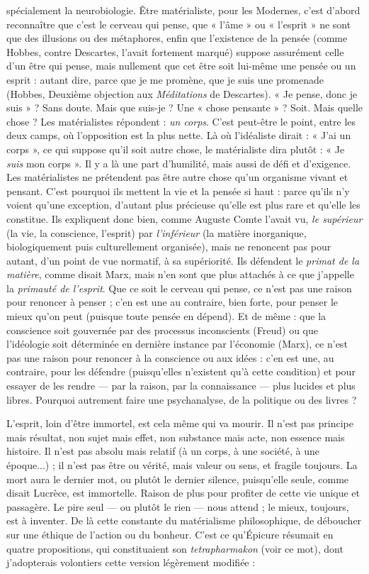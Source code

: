 spécialement la neurobiologie. Être matérialiste, pour les Modernes, c’est
d’abord reconnaître que c’est le cerveau qui pense, que « l’âme » ou « l'esprit »
ne sont que des illusions ou des métaphores, enfin que l'existence de la pensée
(comme Hobbes, contre Descartes, l’avait fortement marqué) suppose assurément
celle d’un être qui pense, mais nullement que cet être soit lui-même une
pensée ou un esprit : autant dire, parce que je me promène, que je suis une promenade
(Hobbes, Deuxième objection aux {\it Méditations} de Descartes). « Je
pense, donc je suis » ? Sans doute. Mais que suis-je ? Une « chose pensante » ?
Soit. Mais quelle chose ? Les matérialistes répondent : {\it un corps}. C’est peut-être
le point, entre les deux camps, où l'opposition est la plus nette. Là où l’idéaliste
dirait : « J’ai un corps », ce qui suppose qu'il soit autre chose, le matérialiste
dira plutôt : « Je {\it suis} mon corps ». Il y a là une part d’humilité, mais aussi de
défi et d’exigence. Les matérialistes ne prétendent pas être autre chose qu’un
organisme vivant et pensant. C’est pourquoi ils mettent la vie et la pensée si
haut : parce qu’ils n’y voient qu’une exception, d’autant plus précieuse qu’elle
est plus rare et qu’elle les constitue. Ils expliquent donc bien, comme Auguste
Comte l'avait vu, {\it le supérieur} (la vie, la conscience, l'esprit) par {\it l’inférieur} (la
matière inorganique, biologiquement puis culturellement organisée), mais ne
renoncent pas pour autant, d’un point de vue normatif, à sa supériorité. Ils
défendent le {\it primat de la matière}, comme disait Marx, mais n’en sont que plus
attachés à ce que j'appelle la {\it primauté de l'esprit}. Que ce soit le cerveau qui
pense, ce n’est pas une raison pour renoncer à penser ; c’en est une au contraire,
bien forte, pour penser le mieux qu’on peut (puisque toute pensée en dépend).
Et de même : que la conscience soit gouvernée par des processus inconscients
(Freud) ou que l'idéologie soit déterminée en dernière instance par l’économie
(Marx), ce n’est pas une raison pour renoncer à la conscience ou aux idées : c’en
est une, au contraire, pour les défendre (puisqu’elles n’existent qu’à cette condition)
et pour essayer de les rendre — par la raison, par la connaissance — plus
lucides et plus libres. Pourquoi autrement faire une psychanalyse, de la politique
ou des livres ?

L'esprit, loin d’être immortel, est cela même qui va mourir. Il n’est pas
principe mais résultat, non sujet mais effet, non substance mais acte, non
essence mais histoire. Il n’est pas absolu mais relatif (à un corps, à une société,
à une époque...) ; il n’est pas être ou vérité, mais valeur ou sens, et fragile toujours.
La mort aura le dernier mot, ou plutôt le dernier silence, puisqu’elle
seule, comme disait Lucrèce, est immortelle. Raison de plus pour profiter de
cette vie unique et passagère. Le pire seul — ou plutôt le rien — nous attend ; le
mieux, toujours, est à inventer. De là cette constante du matérialisme philosophique,
de déboucher sur une éthique de l’action ou du bonheur. C’est ce
qu’Épicure résumait en quatre propositions, qui constituaient son {\it tetrapharmakon}
(voir ce mot), dont j’adopterais volontiers cette version légèrement
modifiée :

